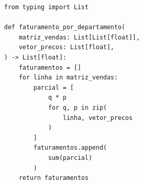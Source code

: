 \ifmostrarGabarito
\begin{verbatim}
from typing import List

def faturamento_por_departamento(
    matriz_vendas: List[List[float]],
    vetor_precos: List[float],
) -> List[float]:
    faturamentos = []
    for linha in matriz_vendas:
        parcial = [
            q * p
            for q, p in zip(
                linha, vetor_precos
            )
        ]
        faturamentos.append(
            sum(parcial)
        )
    return faturamentos
\end{verbatim}

\fi
